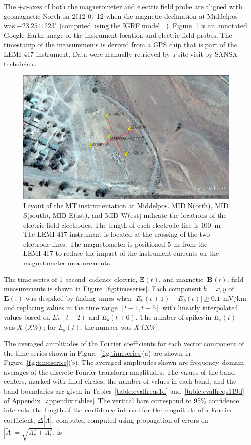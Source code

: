\documentclass[draft,linenumbers]{agujournal2018}
\begin{document}
The $+x$-axes of both the magnetometer and electric field probe are aligned with geomagnetic North on 2012-07-12 when the magnetic declination at Middelpos was $-23.2541323^\circ$ (computed using the IGRF model [\cite{igrf}]). Figure~\ref{fig:site} is an annotated Google Earth image of the instrument location and electric field probes. The timestamp of the measurements is derived from a GPS chip that is part of the LEMI-417 instrument. Data were manually retrieved by a site visit by SANSA technicians. 

\begin{figure}[h]
  \centering
  \includegraphics[width=\textwidth]{figures/site.png}
  \caption{Layout of the MT instrumentation at Middelpos. MID N(orth), MID S(south), MID E(ast), and MID W(est) indicate the locations of the electric field electrodes. The length of each electrode line is $100$~m. The LEMI-417 instrument is located at the crossing of the two electrode lines. The magnetometer is positioned $5$~m from the LEMI-417 to reduce the impact of the instrument currents on the magnetometer measurements. 
}
 \label{fig:site}
\end{figure}

The time series of 1--second--cadence electric, $\mathbf{E}(t)$, and magnetic, $\mathbf{B}(t)$, field measurements is shown in Figure~\ref{fig:timeseries}. Each component $k=x, y$ of $\mathbf{E}(t)$ was despiked by finding times when $|E_k(t+1)-E_k(t)|\ge 0.1$~mV/km and replacing values in the time range $[t-1, t+5]$ with linearly interpolated values based on $E_k(t-2)$ and $E_k(t+6)$. The number of spikes in $E_x(t)$ was $X$  ($X$\%) ; for $E_y(t)$, the number was $X$ ($X$\%).

The averaged amplitudes of the Fourier coefficients for each vector component of the time series shown in Figure~\ref{fig:timeseries}(a) are shown in Figure~\ref{fig:timeseries}(b). The averaged amplitudes shown are frequency--domain averages of the discrete Fourier transform amplitudes. The values of the band centers, marked with filled circles, the number of values in each band, and the band boundaries are given in Tables~\ref{table:evalfreqs1d} and~\ref{table:evalfreqs119d} of Appendix~\ref{appendix:tables}. The vertical bars correspond to 95\% confidence intervals; the length of the confidence interval for the magnitude of a Fourier coefficient, $\Delta|\widetilde{A}|$, computed computed using propagation of errors on $|\widetilde{A}| = \sqrt{A_r^2 + A_i^2}$, is
\end{document}
